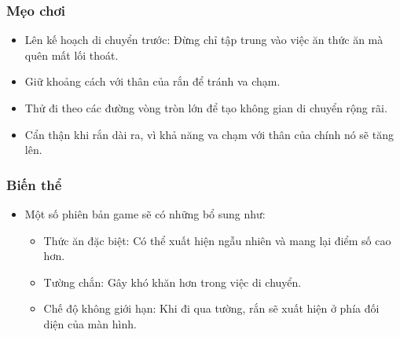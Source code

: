 \documentclass[a4paper, 12pt]{article}
\begin{document}
\subsubsection{Mẹo chơi}
\begin{itemize}
    \item Lên kế hoạch di chuyển trước: Đừng chỉ tập trung vào việc ăn thức ăn mà quên mất lối thoát.
    \item Giữ khoảng cách với thân của rắn để tránh va chạm.
    \item Thử đi theo các đường vòng tròn lớn để tạo không gian di chuyển rộng rãi.
    \item Cẩn thận khi rắn dài ra, vì khả năng va chạm với thân của chính nó sẽ tăng lên.
\end{itemize}

\subsubsection{Biến thể}
\begin{itemize}
    \item Một số phiên bản game sẽ có những bổ sung như:
    \begin{itemize}
        \item Thức ăn đặc biệt: Có thể xuất hiện ngẫu nhiên và mang lại điểm số cao hơn.
        \item Tường chắn: Gây khó khăn hơn trong việc di chuyển.
        \item Chế độ không giới hạn: Khi đi qua tường, rắn sẽ xuất hiện ở phía đối diện của màn hình.
    \end{itemize}
\end{itemize}

\section{}
\end{document}
